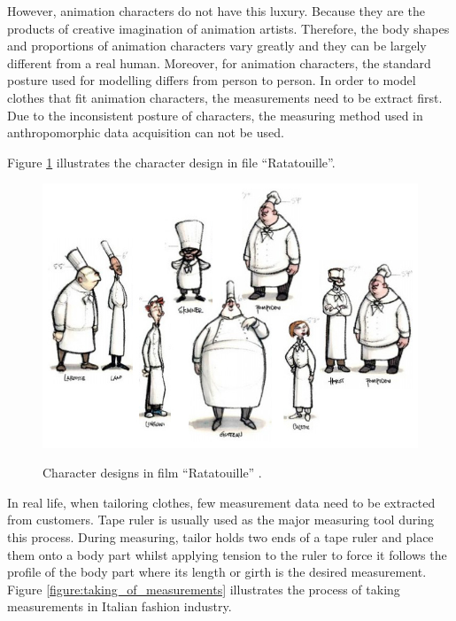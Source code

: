 However, animation characters do not have this luxury. Because they are the products of creative imagination of animation artists. Therefore, the body shapes and proportions of animation characters vary greatly and they can be largely different from a real human. Moreover, for animation characters, the standard posture used for modelling differs from person to person. In order to model clothes that fit animation characters, the measurements need to be extract first. Due to the inconsistent posture of characters, the measuring method used in anthropomorphic data acquisition can not be used. 

Figure \ref{figure:Ratatouille} illustrates the character design in file ``Ratatouille''.

\begin{figure}[H]
    \centering
	\includegraphics[width=0.95\columnwidth]{../images/Ratatouille_character}\\[1cm]
    \caption[An example of character design]{Character designs in film ``Ratatouille'' .}
    \label{figure:Ratatouille}
\end{figure}


In real life, when tailoring clothes, few measurement data need to be extracted from customers. Tape ruler is usually used as the major measuring tool during this process. During measuring, tailor holds two ends of a tape ruler and place them onto a body part whilst applying tension to the ruler to force it follows the profile of the body part where its length or girth is the desired measurement. Figure \ref{figure:taking_of_measurements} illustrates the process of taking measurements in Italian fashion industry\citep{2011practical}.

